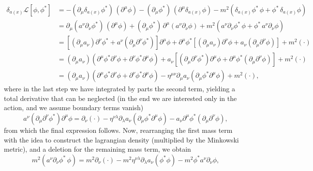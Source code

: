 \[
    \begin{aligned}
        \delta_{a(x)} \mathcal{L}[\phi, \phi^{\ast}]
         & = -(\partial_{\mu} \delta_{a(x)} \phi^{\ast}) \, (\partial^{\mu} \phi) - (\partial_{\mu} \phi^{\ast}) \, (\partial^{\mu} \delta_{a(x)} \phi) - m^2 \left(\delta_{a(x)} \phi^{\ast} \, \phi + \phi^{\ast} \, \delta_{a(x)} \phi\right)                                                                    \\
         & = \partial_{\mu} (a^{\nu} \partial_{\nu} \phi^{\ast}) \, (\partial^{\mu} \phi) + (\partial_{\mu} \phi^{\ast}) \, \partial^{\mu} (a^{\nu} \partial_{\nu} \phi) + m^2 \left(a^{\nu} \partial_{\nu} \phi^{\ast} \, \phi + \phi^{\ast} \, a^{\nu} \partial_{\nu} \phi\right)                                 \\
         & = \left[ (\partial_\mu a_{\nu})\partial^{\nu} \phi^{\ast} + a^{\nu} (\partial_\mu \partial^{\nu} \phi^*) \right] \partial^{\mu} \phi + \partial^{\mu} \phi^{\ast} \left[ (\partial_{\mu} a_{\nu}) \partial^{\nu} \phi + a_{\nu} (\partial_{\mu} \partial^{\nu} \phi) \right] + m^2 (\cdot)               \\
         & = (\partial_{\mu} a_{\nu}) \left( \partial^{\mu} \phi^{\ast} \partial^{\nu} \phi + \partial^{\nu} \phi^{\ast} \partial^{\mu} \phi \right) + a_{\nu} \left[(\partial_\mu \partial^{\nu} \phi^*)\partial^{\mu} \phi + \partial^{\mu} \phi^{\ast} (\partial_{\mu} \partial^{\nu} \phi)\right] + m^2 (\cdot) \\
         & = (\partial_{\mu} a_{\nu}) \left( \partial^{\mu} \phi^{\ast} \partial^{\nu} \phi + \partial^{\nu} \phi^{\ast} \partial^{\mu} \phi \right) - \eta^{\mu\nu} \partial_\mu a_\nu \left( \partial_\mu \phi^* \partial^{\mu} \phi \right) + m^2 (\cdot),
    \end{aligned}
\]
where in the last step we have integrated by parts the second term, yielding a total derivative that can be neglected (in the end we are interested only in the action, and we assume boundary terms vanish)
\[
    a^{\nu} (\partial_\mu \partial^{\nu} \phi^*)\partial^{\mu} \phi = \partial_\nu (\cdot) - \eta^{\nu\lambda} \partial_\lambda a_\nu (\partial_\mu \phi^* \partial^{\mu} \phi) - a_\nu \partial^{\mu} \phi^{\ast} (\partial_{\mu} \partial^{\nu} \phi),
\]
from which the final expression follows. Now, rearranging the first mass term with the idea to construct the lagrangian density (multiplied by the Minkowski metric), and a deletion for the remaining mass term, we obtain
\[
    m^2 \left(a^{\nu} \partial_{\nu} \phi^{\ast} \, \phi\right) = m^2 \partial_\nu (\cdot) - m^2 \eta^{\nu \lambda} \partial_\lambda a_\nu (\phi^* \phi) - m^2 \phi^* a^\nu \partial_\nu \phi,
\]

